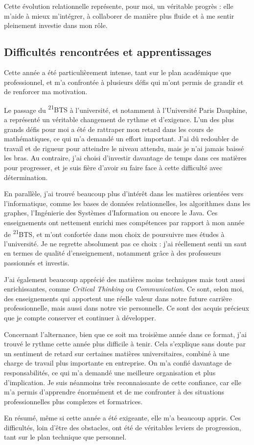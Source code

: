 Cette évolution relationnelle représente, pour moi, un véritable progrès : elle m’aide à mieux m’intégrer, à collaborer de manière plus fluide et à me sentir pleinement investie dans mon rôle.

\subsection{Difficultés rencontrées et apprentissages}

Cette année a été particulièrement intense, tant sur le plan académique que professionnel, et m’a confrontée à plusieurs défis qui m’ont permis de grandir et de renforcer ma motivation.

Le passage du \textsc{\textsuperscript{21}BTS} à l’université, et notamment à l’Université Paris Dauphine, a représenté un véritable changement de rythme et d’exigence. L’un des plus grands défis pour moi a été de rattraper mon retard dans les cours de mathématiques, ce qui m’a demandé un effort important. J’ai dû redoubler de travail et de rigueur pour atteindre le niveau attendu, mais je n’ai jamais baissé les bras. Au contraire, j’ai choisi d’investir davantage de temps dans ces matières pour progresser, et je suis fière d’avoir su faire face à cette difficulté avec détermination.

En parallèle, j’ai trouvé beaucoup plus d’intérêt dans les matières orientées vers l’informatique, comme les bases de données relationnelles, les algorithmes dans les graphes, l'Ingénierie des Systèmes d’Information ou encore le Java. Ces enseignements ont nettement enrichi mes compétences par rapport à mon année de \textsuperscript{21}BTS, et m’ont confortée dans mon choix de poursuivre mes études à l’université. Je ne regrette absolument pas ce choix : j’ai réellement senti un saut en termes de qualité d’enseignement, notamment grâce à des professeurs passionnés et investis.

J’ai également beaucoup apprécié des matières moins techniques mais tout aussi enrichissantes, comme \textit{Critical Thinking} ou \textit{Communication}. Ce sont, selon moi, des enseignements qui apportent une réelle valeur dans notre future carrière professionnelle, mais aussi dans notre vie personnelle. Ce sont des acquis précieux que je compte conserver et continuer à développer.

Concernant l’alternance, bien que ce soit ma troisième année dans ce format, j’ai trouvé le rythme cette année plus difficile à tenir. Cela s’explique sans doute par un sentiment de retard sur certaines matières universitaires, combiné à une charge de travail plus importante en entreprise. On m’a confié davantage de responsabilités, ce qui m’a demandé une meilleure organisation et plus d’implication. Je suis néanmoins très reconnaissante de cette confiance, car elle m’a permis d’apprendre énormément et de me confronter à des situations professionnelles plus complexes et formatrices.

En résumé, même si cette année a été exigeante, elle m’a beaucoup appris. Ces difficultés, loin d’être des obstacles, ont été de véritables leviers de progression, tant sur le plan technique que personnel.

